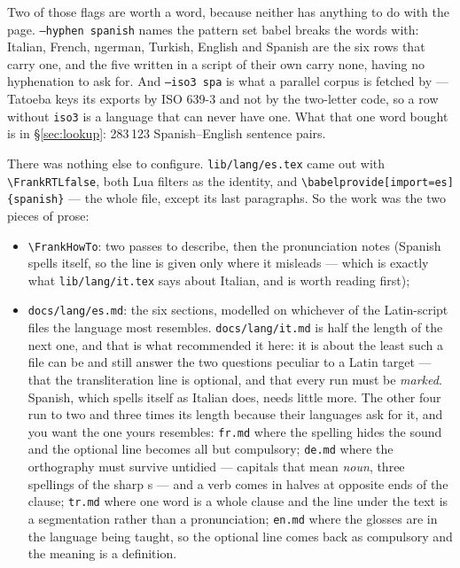 \documentclass[11pt,oneside]{report}
\newcommand{\file}[1]{\texttt{#1}}
\begin{document}
\noindent Two of those flags are worth a word, because neither has anything
to do with the page. \texttt{--hyphen spanish} names the pattern set babel
breaks the words with: Italian, French, ngerman, Turkish, English and Spanish
are the six rows that carry one, and the five written in a script of their
own carry none, having no hyphenation to ask for. And \texttt{--iso3 spa} is
what a parallel corpus is fetched by --- Tatoeba keys its exports by ISO
639-3 and not by the two-letter code, so a row without \texttt{iso3} is a
language that can never have one. What that one word bought is in
\S\ref{sec:lookup}: 283\,123 Spanish--English sentence pairs.

There was nothing else to configure. \file{lib/lang/es.tex} came out with
\texttt{\textbackslash FrankRTLfalse}, both Lua filters as the identity, and
\texttt{\textbackslash babelprovide[import=es]\{spanish\}} --- the whole
file, except its last paragraphs. So the work was the two pieces of prose:

\begin{itemize}
\item \texttt{\textbackslash FrankHowTo}: two passes to describe, then the
  pronunciation notes (Spanish spells itself, so the line is given only where
  it misleads --- which is exactly what \file{lib/lang/it.tex} says about
  Italian, and is worth reading first);
\item \file{docs/lang/es.md}: the six sections, modelled on whichever of the
  Latin-script files the language most resembles.
  \file{docs/lang/it.md} is half the length of the next one, and that is what
  recommended it here: it is about the least such a file can be and still
  answer the two questions peculiar to a Latin target --- that the
  transliteration line is optional, and that every run must be
  \emph{marked}. Spanish, which spells itself as Italian does, needs little
  more. The other four run to two and three times its length because their
  languages ask for it, and you want the one yours resembles: \file{fr.md}
  where the spelling hides the sound and the optional line becomes all but
  compulsory; \file{de.md} where the orthography must survive untidied ---
  capitals that mean \emph{noun}, three spellings of the sharp s --- and a
  verb comes in halves at opposite ends of the clause; \file{tr.md} where
  one word is a whole clause and the line under the text is a segmentation
  rather than a pronunciation; \file{en.md} where the glosses are in the
  language being taught, so the optional line comes back as compulsory and
  the meaning is a definition.
\end{itemize}
\end{document}
